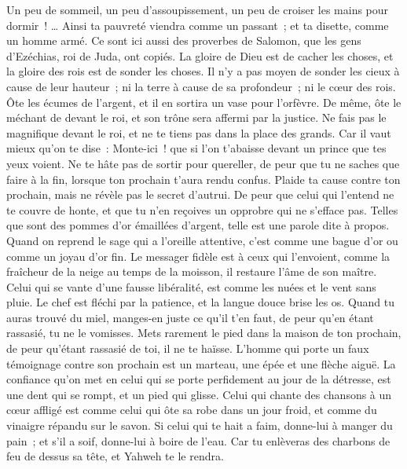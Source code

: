 \begin{multicols}{2}
Un peu de sommeil, un peu d'assoupissement, un peu de croiser les mains pour dormir~! …
Ainsi ta pauvreté viendra comme un passant~; et ta disette, comme un homme armé.
\VerseOne{}Ce sont ici aussi des proverbes de Salomon, que les gens d'Ezéchias, roi de Juda, ont copiés.
La gloire de Dieu est de cacher les choses, et la gloire des rois est de sonder les choses.
Il n'y a pas moyen de sonder les cieux à cause de leur hauteur~; ni la terre à cause de sa profondeur~; ni le cœur des rois.
Ôte les écumes de l'argent, et il en sortira un vase pour l'orfèvre.
 De même, ôte le méchant de devant le roi, et son trône sera affermi par la justice.
Ne fais pas le magnifique devant le roi, et ne te tiens pas dans la place des grands.
Car il vaut mieux qu'on te dise~: Monte-ici~! que si l'on t'abaisse devant un prince que tes yeux voient.
Ne te hâte pas de sortir pour quereller, de peur que tu ne saches que faire à la fin, lorsque ton prochain t'aura rendu confus.
Plaide ta cause contre ton prochain, mais ne révèle pas le secret d'autrui.
De peur que celui qui l'entend ne te couvre de honte, et que tu n'en reçoives un opprobre qui ne s'efface pas.
Telles que sont des pommes d'or émaillées d'argent, telle est une parole dite à propos.
Quand on reprend le sage qui a l'oreille attentive, c'est comme une bague d'or ou comme un joyau d'or fin.
Le messager fidèle est à ceux qui l'envoient, comme la fraîcheur de la neige au temps de la moisson, il restaure l'âme de son maître.
Celui qui se vante d'une fausse libéralité, est comme les nuées et le vent sans pluie.
Le chef est fléchi par la patience, et la langue douce brise les os.
Quand tu auras trouvé du miel, manges-en juste ce qu'il t'en faut, de peur qu'en étant rassasié, tu ne le vomisses.
Mets rarement le pied dans la maison de ton prochain, de peur qu'étant rassasié de toi, il ne te haïsse.
L'homme qui porte un faux témoignage contre son prochain est un marteau, une épée et une flèche aiguë.
La confiance qu'on met en celui qui se porte perfidement au jour de la détresse, est une dent qui se rompt, et un pied qui glisse.
Celui qui chante des chansons à un cœur affligé est comme celui qui ôte sa robe dans un jour froid, et comme du vinaigre répandu sur le savon.
Si celui qui te hait a faim, donne-lui à manger du pain~; et s'il a soif, donne-lui à boire de l'eau.
Car tu enlèveras des charbons de feu de dessus sa tête, et Yahweh te le rendra.

\end{multicols}
